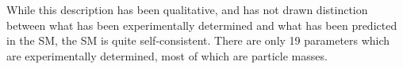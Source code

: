 While this description has been qualitative, and has not drawn distinction between what has been experimentally determined and what has been predicted in the SM, the SM is quite self-consistent. There are only 19 parameters which are experimentally determined, most of which are particle masses.





